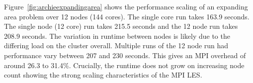 Figure~\ref{fig:archieexpandingarea} shows the performance scaling of an
expanding area problem over 12 nodes (144 cores). The single core run takes
163.9 seconds. The single node (12 core) run takes 215.5 seconds and the 12 node
run takes 208.9 seconds. The variation in runtime between nodes is likely due to
the differing load on the cluster overall. Multiple runs of the 12 node run had
performance vary between 207 and 230 seconds. This gives an MPI overhead of
around 26.3 to 31.4\%. Crucially, the runtime does not grow on increasing node
count showing the strong scaling characteristics of the MPI LES.
